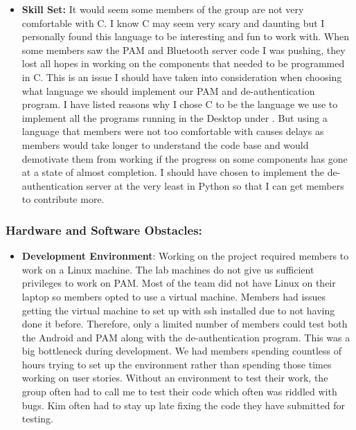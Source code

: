 \documentclass[letterpaper,twocolumn,10pt]{article}
\begin{document}
{{\begin{itemize}[noitemsep]
\begin{itemize}[noitemsep]
\item \textbf{Skill Set:} It would seem some members of the group are not very comfortable with C. I know C may seem very scary and daunting but I personally found this language to be interesting and fun to work with. When some members saw the PAM and Bluetooth server code I was pushing, they lost all hopes in working on the components that needed to be programmed in C. This is an issue I should have taken into consideration when choosing what language we should implement our PAM and de-authentication program. I have listed reasons why I chose C to be the language we use to implement all the programs running in the Desktop under . But using a language that members were not too comfortable with causes delays as members would take longer to understand the code base and would demotivate them from working if the progress on some components has gone at a state of almost completion. I should have chosen to implement the de-authentication server at the very least in Python so that I can get members to contribute more.
\end{itemize}
\end{itemize}

\label{sssec:num1}

\subsubsection{Hardware and Software Obstacles:}
\begin{itemize}[noitemsep]
\item \textbf{Development Environment}: Working on the project required members to work on a Linux machine. The lab machines do not give us sufficient privileges to work on PAM. Most of the team did not have Linux on their laptop so members opted to use a virtual machine. Members had issues getting the virtual machine to set up with ssh installed due to not having done it before. Therefore, only a limited number of members could test both the Android and PAM along with the de-authentication program. This was a big bottleneck during development. We had members spending countless of hours trying to set up the environment rather than spending those times working on user stories. Without an environment to test their work, the group often had to call me to test their code which often was riddled with bugs. Kim often had to stay up late fixing the code they have submitted for testing.


\end{itemize}}}
\end{document}
